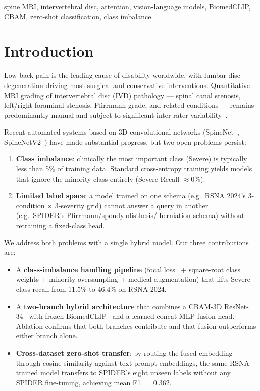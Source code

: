 \documentclass[conference]{IEEEtran}
\begin{document}
\begin{IEEEkeywords}
spine MRI, intervertebral disc, attention, vision-language models,
BiomedCLIP, CBAM, zero-shot classification, class imbalance.
\end{IEEEkeywords}

\section{Introduction}
\label{sec:intro}

Low back pain is the leading cause of disability worldwide, with lumbar
disc degeneration driving most surgical and conservative interventions.
Quantitative MRI grading of intervertebral disc (IVD) pathology --- spinal
canal stenosis, left/right foraminal stenosis, Pfirrmann grade, and
related conditions --- remains predominantly manual and subject to
significant inter-rater variability~\cite{hallinan2021,nigru2024}.

Recent automated systems based on 3D convolutional networks
(SpineNet~\cite{jamaludin2017}, SpineNetV2~\cite{windsor2022}) have made
substantial progress, but two open problems persist:
\begin{enumerate}
\item \textbf{Class imbalance}: clinically the most important class
      (Severe) is typically less than 5\% of training data. Standard
      cross-entropy training yields models that ignore the minority
      class entirely (Severe Recall $\approx 0$\%).
\item \textbf{Limited label space}: a model trained on one schema (e.g.\
      RSNA 2024's 3-condition $\times$ 3-severity grid) cannot answer
      a query in another (e.g.\ SPIDER's Pfirrmann/spondylolisthesis/
      herniation schema) without retraining a fixed-class head.
\end{enumerate}

We address both problems with a single hybrid model. Our three
contributions are:
\begin{itemize}
\item A \textbf{class-imbalance handling pipeline} (focal
      loss~\cite{lin2017focal} + square-root class weights + minority
      oversampling + medical augmentation) that lifts Severe-class
      recall from 11.5\% to 46.4\% on RSNA 2024.
\item A \textbf{two-branch hybrid architecture} that combines a CBAM-3D
      ResNet-34~\cite{woo2018cbam,he2016resnet} with frozen
      BiomedCLIP~\cite{zhang2023biomedclip} and a learned concat-MLP
      fusion head. Ablation confirms that both branches contribute
      and that fusion outperforms either branch alone.
\item \textbf{Cross-dataset zero-shot transfer}: by routing the fused
      embedding through cosine similarity against text-prompt
      embeddings, the same RSNA-trained model transfers to SPIDER's
      eight unseen labels without any SPIDER fine-tuning, achieving
      mean F1~=~0.362.
\end{itemize}
\end{document}
